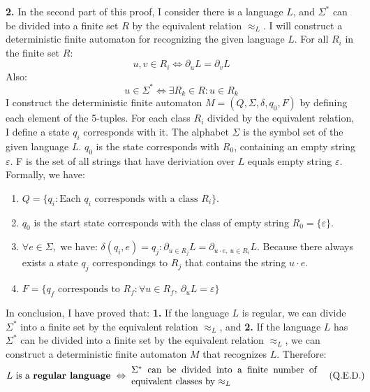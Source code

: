 \documentclass[a4paper,12pt]{article}
\begin{document}
\vspace{1em}
\textbf{2.} In the second part of this proof, I consider there is a language $L$, and $\Sigma^{*}$ can be divided into a finite set $R$ by the equivalent relation $\approx_{L}$. I will construct a deterministic finite automaton for recognizing the given language $L$. For all $R_{i}$ in the finite set $R$:
\begin{equation*}
    u, v \in R_{i} \Leftrightarrow \partial_{u}L = \partial_{v}L
\end{equation*}
\noindent
Also:
\begin{equation*}
    u \in \Sigma^{*} \Leftrightarrow \exists R_{k} \in R : u \in R_{k}
\end{equation*}
I construct the deterministic finite automaton $M=(Q,\Sigma,\delta,q_{0},F)$ by defining each element of the 5-tuples. For each class $R_{i}$ divided by the equivalent relation, I define a state $q_{i}$ corresponds with it. The alphabet $\Sigma$ is the symbol set of the given language $L$. $q_{0}$ is the state corresponds with $R_{0}$, containing an empty string $\varepsilon$. F is the set of all strings that have deriviation over $L$ equals empty string $\varepsilon$. Formally, we have:
\begin{enumerate}
    \item $Q = \{q_{i} : \mbox{Each } q_{i} \mbox{ corresponds with a class } R_{i}\}$.
    \item $q_{0}$ is the start state corresponds with the class of empty string $R_{0} = \{\varepsilon\}$.
    \item $\forall e \in \Sigma,\mbox{ we have: } \delta(q_{i}, e) = q_{j} : \partial_{u \in R_{j}}L = \partial_{u\cdot e,\ u \in R_{i}}L$. Because there always exists a state $q_{j}$ correspondings to $R_{j}$ that contains the string $u\cdot e$.
    \item $F = \{q_{f} \mbox{ corresponds to } R_{f} : \forall u \in R_{f},\ \partial_{u}L = \varepsilon\}$
\end{enumerate}

In conclusion, I have proved that: \textbf{1.} If the language $L$ is regular, we can divide $\Sigma^{*}$ into a finite set by the equivalent relation $\approx_{L}$, and \textbf{2.} If the language $L$ has $\Sigma^{*}$ can be divided into a finite set by the equivalent relation $\approx_{L}$, we can construct a deterministic finite automaton $M$ that recognizes $L$. Therefore:
\begin{equation*}
    L \mbox{ is a \textbf{regular language} } \Leftrightarrow \ \parbox[c]{7cm}{$\Sigma^{*}$ can be divided into a finite number of equivalent classes by $\approx_{L}$} \ \ \ \ \parbox[c]{1cm}{ (Q.E.D.)}
\end{equation*}
\end{document}
